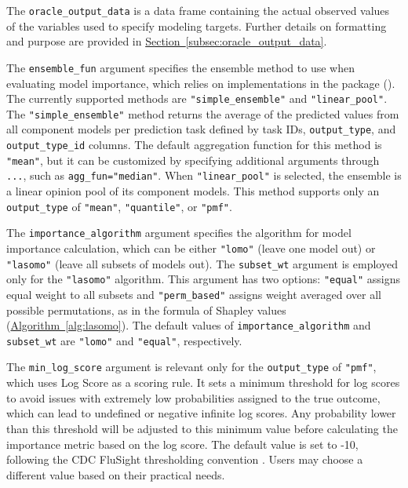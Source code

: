 \documentclass[
  article,
  shortnames,
  notitle]{jss}
\begin{document}
The \texttt{oracle\_output\_data} is a data frame containing the actual
observed values of the variables used to specify modeling targets.
Further details on formatting and purpose are provided in
\hyperref[subsec:oracle_output_data]{Section~\ref{subsec:oracle_output_data}}.

The \texttt{ensemble\_fun} argument specifies the ensemble method to use
when evaluating model importance, which relies on implementations in the
 package (\citet{Rpackage-hubEnsembles}). The
currently supported methods are \texttt{"simple\_ensemble"} and
\texttt{"linear\_pool"}. The \texttt{"simple\_ensemble"} method returns
the average of the predicted values from all component models per
prediction task defined by task IDs, \texttt{output\_type}, and
\texttt{output\_type\_id} columns. The default aggregation function for
this method is \texttt{"mean"}, but it can be customized by specifying
additional arguments through \texttt{...}, such as
\texttt{agg\_fun="median"}. When \texttt{"linear\_pool"} is selected,
the ensemble is a linear opinion pool of its component models. This
method supports only an \texttt{output\_type} of \texttt{"mean"},
\texttt{"quantile"}, or \texttt{"pmf"}.

The \texttt{importance\_algorithm} argument specifies the algorithm for
model importance calculation, which can be either \texttt{"lomo"} (leave
one model out) or \texttt{"lasomo"} (leave all subsets of models out).
The \texttt{subset\_wt} argument is employed only for the
\texttt{"lasomo"} algorithm. This argument has two options:
\texttt{"equal"} assigns equal weight to all subsets and
\texttt{"perm\_based"} assigns weight averaged over all possible
permutations, as in the formula of Shapley values
(\hyperref[alg:lasomo]{Algorithm~\ref{alg:lasomo}}). The default values
of \texttt{importance\_algorithm} and \texttt{subset\_wt} are
\texttt{"lomo"} and \texttt{"equal"}, respectively.

The \texttt{min\_log\_score} argument is relevant only for the
\texttt{output\_type} of \texttt{"pmf"}, which uses Log Score as a
scoring rule. It sets a minimum threshold for log scores to avoid issues
with extremely low probabilities assigned to the true outcome, which can
lead to undefined or negative infinite log scores. Any probability lower
than this threshold will be adjusted to this minimum value before
calculating the importance metric based on the log score. The default
value is set to -10, following the CDC FluSight thresholding convention
\citep{brooks2018nonmechanistic, reich_accuracy_2019}. Users may choose
a different value based on their practical needs.
\end{document}
